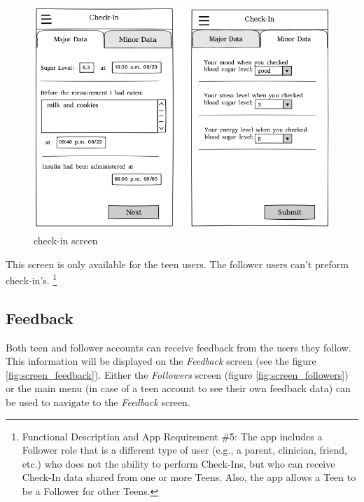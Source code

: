\documentclass{article}
\begin{document}
    \begin{figure}[h]
        \centering
        \includegraphics[width=\textwidth,height=\textheight,keepaspectratio]{checkin.png}
        \caption{check-in screen}
        \label{fig:screen_checkin}
    \end{figure}

    This screen is only available for the teen users. The follower users can't preform check-in's.
    \footnote{Functional Description and App Requirement \#5: The app includes a Follower role that is a different type of user (e.g., a parent, clinician, friend, etc.) who does not the ability to perform Check-Ins, but who can receive Check-In data shared from one or more Teens. Also, the app allows a Teen to be a Follower for other Teens.}

\newpage

    \subsection{Feedback}

    Both teen and follower accounts can receive feedback from the users they follow. This information will be displayed on the \emph{Feedback} screen (see the figure \ref{fig:screen_feedback}). Either the \emph{Followers} screen (figure \ref{fig:screen_followers}) or the main menu (in case of a teen account to see their own feedback data) can be used to navigate to the \emph{Feedback} screen. 
\end{document}

